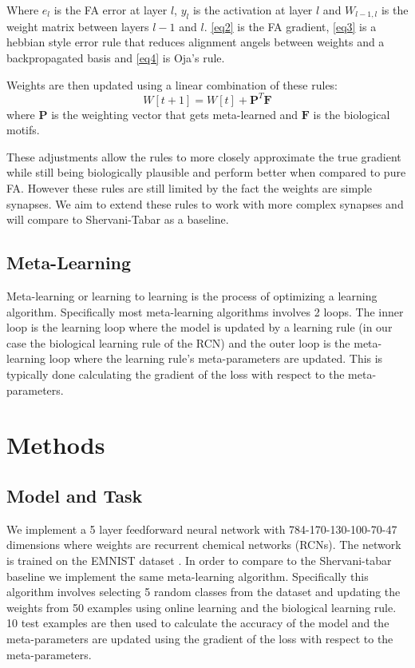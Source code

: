 \documentclass[a4paper, 11pt, oneside]{report}
\begin{document}
Where $e_{l}$ is the FA error at layer $l$, $y_{l}$ is the activation at layer $l$ and $W_{l-1,l}$ is the weight matrix between layers $l-1$ and $l$.
\ref{eq2} is the FA gradient, \ref{eq3} is a hebbian style error rule that reduces alignment angels between 
weights and a backpropagated basis and \ref{eq4} is Oja's rule.

Weights are then updated using a linear combination of these rules:
\begin{equation}
    W[t+1] = W[t] + \mathbf{P}^T\mathbf{F}
\end{equation}
where $\mathbf{P}$ is the weighting vector that gets meta-learned and $\mathbf{F}$ is the biological motifs.

These adjustments allow the rules to more closely approximate the true gradient
while still being biologically plausible and perform better when compared to pure FA.
However these rules are still limited by the fact the weights are simple synapses.
We aim to extend these rules to work with more complex synapses and will compare to Shervani-Tabar as a baseline.

\subsection*{Meta-Learning}

Meta-learning \cite{schmidhuber1987srl} or learning to learning is the process of optimizing a learning algorithm.
Specifically most meta-learning algorithms involves 2 loops. The inner loop is the learning loop where the model is updated
by a learning rule (in our case the biological learning rule of the RCN) and the outer loop is the meta-learning loop where the learning rule's
meta-parameters are updated. This is typically done calculating the gradient of the loss with respect to the meta-parameters. 

\section*{Methods}

\subsection*{Model and Task}

We implement a 5 layer feedforward neural network with 784-170-130-100-70-47 dimensions where weights are recurrent chemical networks (RCNs).
The network is trained on the EMNIST dataset \cite{cohen2017}.
In order to compare to the Shervani-tabar baseline we implement the same meta-learning algorithm.
Specifically this algorithm involves selecting 5 random classes from the dataset and updating the weights from 50
examples using online learning and the biological learning rule. 10 test examples are then used to calculate the accuracy of the model
and the meta-parameters are updated using the gradient of the loss with respect to the meta-parameters.
\end{document}
